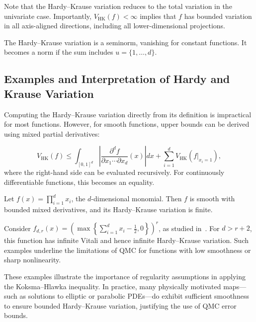 Note that the Hardy--Krause variation reduces to the total variation in the univariate case. Importantly, $V_{\mathrm{HK}}(f) < \infty$ implies that $f$ has bounded variation in all axis-aligned directions, including all lower-dimensional projections.

\begin{remark}
The Hardy--Krause variation is a seminorm, vanishing for constant functions. It becomes a norm if the sum includes $u = \{1,\dots,d\}$.
\end{remark}

  \subsection{Examples and Interpretation of Hardy and Krause Variation}
  \label{sec:hk-examples}

Computing the Hardy–Krause variation directly from its definition is impractical for most functions. However, for smooth functions, upper bounds can be derived using mixed partial derivatives:

\begin{equation*}
    V_{\mathrm{HK}}(f) \leq \int_{[0,1]^d} \left| \frac{\partial^d f}{\partial x_1 \cdots \partial x_d}(x) \right| dx + \sum_{i=1}^d V_{\mathrm{HK}}(f|_{x_i = 1}),
\end{equation*}
where the right-hand side can be evaluated recursively. For continuously differentiable functions, this becomes an equality.

\begin{example}
Let $f(x) = \prod_{i=1}^d x_i$, the $d$-dimensional monomial. Then $f$ is smooth with bounded mixed derivatives, and its Hardy–Krause variation is finite.
\end{example}

\begin{example}
Consider $f_{d,r}(x) = \left( \max\left\{ \sum_{i=1}^d x_i - \frac{1}{2}, 0 \right\} \right)^r$, as studied in~\cite{owen2005multidimensional}. For $d > r + 2$, this function has infinite Vitali and hence infinite Hardy–Krause variation. Such examples underline the limitations of QMC for functions with low smoothness or sharp nonlinearity.
\end{example}

These examples illustrate the importance of regularity assumptions in applying the Koksma–Hlawka inequality. In practice, many physically motivated maps—such as solutions to elliptic or parabolic PDEs—do exhibit sufficient smoothness to ensure bounded Hardy–Krause variation, justifying the use of QMC error bounds.

